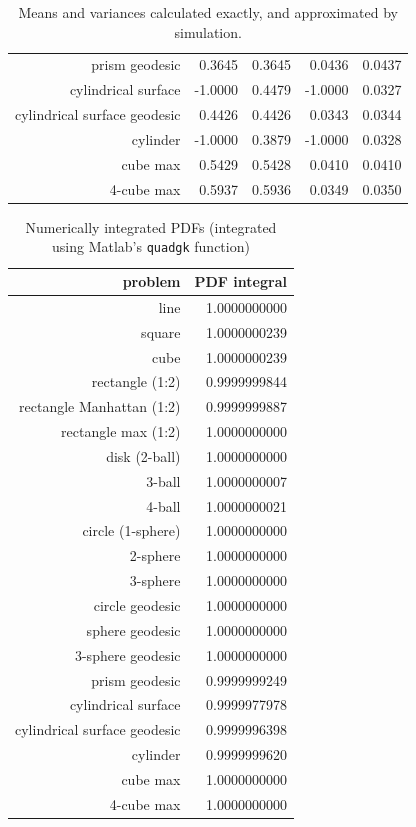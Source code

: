 \begin{table}[ht]
\begin{tabular}{r|rrrr}
           prism geodesic &   0.3645 &         0.3645 &   0.0436 &         0.0437 \\
      cylindrical surface &  -1.0000 &         0.4479 &  -1.0000 &         0.0327 \\
cylindrical surface geodesic &   0.4426 &         0.4426 &   0.0343 &         0.0344 \\
                 cylinder &  -1.0000 &         0.3879 &  -1.0000 &         0.0328 \\
                 cube max &   0.5429 &         0.5428 &   0.0410 &         0.0410 \\
               4-cube max &   0.5937 &         0.5936 &   0.0349 &         0.0350 \\
  \end{tabular}
  \caption{Means and variances calculated exactly, and approximated by simulation.}
  \label{tab:mean_var_estimates}
\end{table}






\begin{table}[ht]
  \centering
  \begin{tabular}{r|r}
                  problem & PDF integral \\
     \hline 
                     line & 1.0000000000 \\
                   square & 1.0000000239 \\
                     cube & 1.0000000239 \\
          rectangle (1:2) & 0.9999999844 \\
rectangle Manhattan (1:2) & 0.9999999887 \\
      rectangle max (1:2) & 1.0000000000 \\
            disk (2-ball) & 1.0000000000 \\
                   3-ball & 1.0000000007 \\
                   4-ball & 1.0000000021 \\
        circle (1-sphere) & 1.0000000000 \\
                 2-sphere & 1.0000000000 \\
                 3-sphere & 1.0000000000 \\
          circle geodesic & 1.0000000000 \\
          sphere geodesic & 1.0000000000 \\
        3-sphere geodesic & 1.0000000000 \\
           prism geodesic & 0.9999999249 \\
      cylindrical surface & 0.9999977978 \\
cylindrical surface geodesic & 0.9999996398 \\
                 cylinder & 0.9999999620 \\
                 cube max & 1.0000000000 \\
               4-cube max & 1.0000000000 \\
  \end{tabular}
  \caption{Numerically integrated PDFs (integrated using Matlab's {\tt quadgk} function)}
  \label{tab:numerical_pdf_sum}
\end{table}
